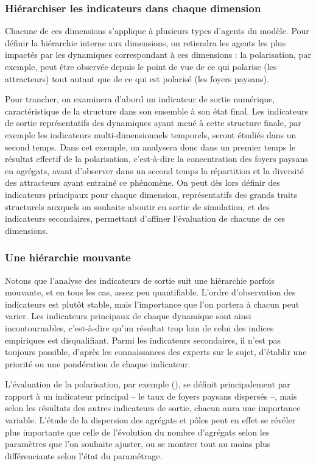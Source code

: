\subsubsection{Hiérarchiser les indicateurs dans chaque dimension}\label{par:hierarchie_interne}
Chacune de ces dimensions s'applique à plusieurs types d'agents du modèle.
Pour définir la hiérarchie interne aux dimensions, on retiendra les agents les plus impactés par les dynamiques correspondant à ces dimensions :
la polarisation, par exemple, peut être observée depuis le point de vue de ce qui polarise (les attracteurs) tout autant que de ce qui est polarisé (les foyers paysans).

Pour trancher, on examinera d'abord un indicateur de sortie numérique, caractéristique de la structure dans son ensemble à son état final.
Les indicateurs de sortie représentatifs des dynamiques ayant mené à cette structure finale, par exemple les indicateurs multi-dimensionnels temporels, seront étudiés dans un second temps.
Dans cet exemple, on analysera donc dans un premier temps le résultat effectif de la polarisation, c'est-à-dire la concentration des foyers paysans en agrégats, avant d'observer dans un second temps la répartition et la diversité des attracteurs ayant entrainé ce phénomène.
On peut dès lors définir des \og indicateurs principaux\fg{} pour chaque dimension, représentatifs des grands traits structurels auxquels on souhaite aboutir en sortie de simulation, et des \og indicateurs secondaires\fg{}, permettant d'affiner l'évaluation de chacune de ces dimensions.

\subsubsection{Une hiérarchie mouvante}
Notons que l'analyse des indicateurs de sortie suit une hiérarchie parfois mouvante, et en tous les cas, assez peu quantifiable.
L'ordre d'observation des indicateurs est plutôt stable, mais l'importance que l'on portera à chacun peut varier.
Les indicateurs principaux de chaque dynamique sont ainsi \og incontournables\fg{}, c'est-à-dire qu'un résultat trop loin de celui des indices empiriques est disqualifiant.
Parmi les indicateurs secondaires, il n'est pas toujours possible, d'après les connaissances des experts sur le sujet, d'établir une priorité ou une pondération de chaque indicateur.

L'évaluation de la polarisation, par exemple (), se définit principalement par rapport à un indicateur principal -- le taux de foyers paysans dispersés --, mais selon les résultats des autres indicateurs de sortie, chacun aura une importance variable.
L'étude de la dispersion des agrégats et pôles peut en effet se révéler plus importante que celle de l'évolution du nombre d'agrégats selon les paramètres que l'on souhaite ajuster, ou se montrer tout au moins plus différenciante selon l'état du paramétrage.

